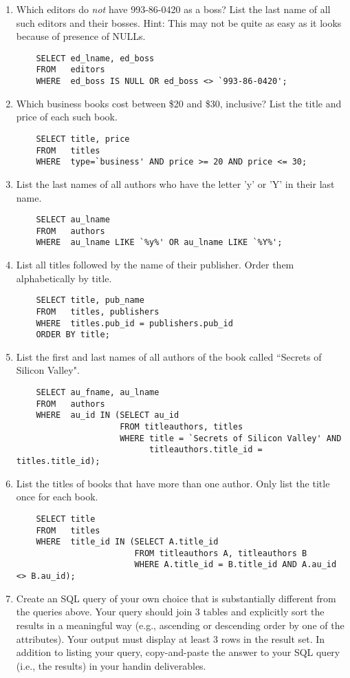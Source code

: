 \documentclass{article}
\begin{document}
\begin{enumerate}
\item Which editors do \textit{not} have 993-86-0420 as a boss? List the last name of all such editors and their bosses. Hint: This may not be quite as easy as it looks because of presence of NULLs.
	\begin{verbatim}
	SELECT ed_lname, ed_boss
	FROM   editors
	WHERE  ed_boss IS NULL OR ed_boss <> `993-86-0420';
	\end{verbatim}

\item Which business books cost between \$20 and \$30, inclusive? List the title and price of each such book.
	\begin{verbatim}
	SELECT title, price
	FROM   titles
	WHERE  type=`business' AND price >= 20 AND price <= 30;
	\end{verbatim}

\item List the last names of all authors who have the letter 'y' or 'Y' in their last name.
	\begin{verbatim}
	SELECT au_lname
	FROM   authors
	WHERE  au_lname LIKE `%y%' OR au_lname LIKE `%Y%';
	\end{verbatim}

\item List all titles followed by the name of their publisher. Order them alphabetically by title.
	\begin{verbatim}
	SELECT title, pub_name
	FROM   titles, publishers
	WHERE  titles.pub_id = publishers.pub_id
	ORDER BY title;
	\end{verbatim}

\item List the first and last names of all authors of the book called ``Secrets of Silicon Valley".
	\begin{verbatim}
	SELECT au_fname, au_lname
	FROM   authors
	WHERE  au_id IN (SELECT au_id
	                 FROM titleauthors, titles
	                 WHERE title = `Secrets of Silicon Valley' AND
	                       titleauthors.title_id = titles.title_id);
	\end{verbatim}

\item List the titles of books that have more than one author. Only list the title once for each book.
	\begin{verbatim}
	SELECT title
	FROM   titles
	WHERE  title_id IN (SELECT A.title_id
	                    FROM titleauthors A, titleauthors B
	                    WHERE A.title_id = B.title_id AND A.au_id <> B.au_id);
	\end{verbatim}

\item Create an SQL query of your own choice that is substantially different from the queries above. Your query should join 3 tables and explicitly sort the results in a meaningful way (e.g., ascending or descending order by one of the attributes). Your output must display at least 3 rows in the result set. In addition to listing your query, copy-and-paste the answer to your SQL query (i.e., the results) in your handin deliverables.

	
\end{enumerate}
\end{document}
